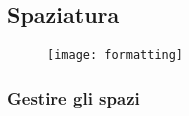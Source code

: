\subsection{Spaziatura}
\begin{frame}
 \begin{figure}[h]
  \centering
  \texttt{[image: formatting]}
 \end{figure}

\end{frame}

\begin{frame}
 \frametitle{Gestire gli spazi}
 
\end{frame}
